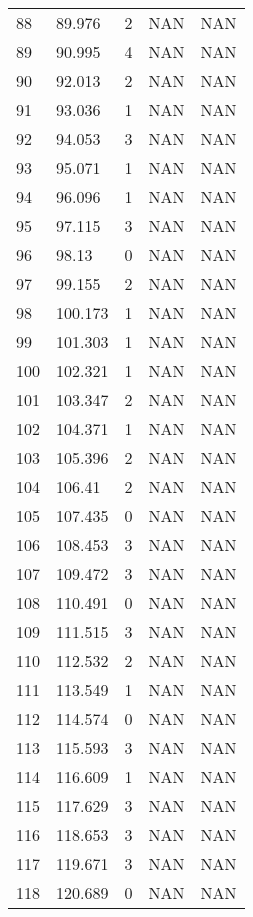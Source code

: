 \documentclass{article}
\begin{document}
\begin{longtable}{@{}lllll@{}}
					88  & 89.976  & 2     & NAN   & NAN   \\
					89  & 90.995  & 4     & NAN   & NAN   \\
					90  & 92.013  & 2     & NAN   & NAN   \\
					91  & 93.036  & 1     & NAN   & NAN   \\
					92  & 94.053  & 3     & NAN   & NAN   \\
					93  & 95.071  & 1     & NAN   & NAN   \\
					94  & 96.096  & 1     & NAN   & NAN   \\
					95  & 97.115  & 3     & NAN   & NAN   \\
					96  & 98.13   & 0     & NAN   & NAN   \\
					97  & 99.155  & 2     & NAN   & NAN   \\
					98  & 100.173 & 1     & NAN   & NAN   \\
					99  & 101.303 & 1     & NAN   & NAN   \\
					100 & 102.321 & 1     & NAN   & NAN   \\
					101 & 103.347 & 2     & NAN   & NAN   \\
					102 & 104.371 & 1     & NAN   & NAN   \\
					103 & 105.396 & 2     & NAN   & NAN   \\
					104 & 106.41  & 2     & NAN   & NAN   \\
					105 & 107.435 & 0     & NAN   & NAN   \\
					106 & 108.453 & 3     & NAN   & NAN   \\
					107 & 109.472 & 3     & NAN   & NAN   \\
					108 & 110.491 & 0     & NAN   & NAN   \\
					109 & 111.515 & 3     & NAN   & NAN   \\
					110 & 112.532 & 2     & NAN   & NAN   \\
					111 & 113.549 & 1     & NAN   & NAN   \\
					112 & 114.574 & 0     & NAN   & NAN   \\
					113 & 115.593 & 3     & NAN   & NAN   \\
					114 & 116.609 & 1     & NAN   & NAN   \\
					115 & 117.629 & 3     & NAN   & NAN   \\
					116 & 118.653 & 3     & NAN   & NAN   \\
					117 & 119.671 & 3     & NAN   & NAN   \\
					118 & 120.689 & 0     & NAN   & NAN   \\

\end{longtable}
\end{document}
